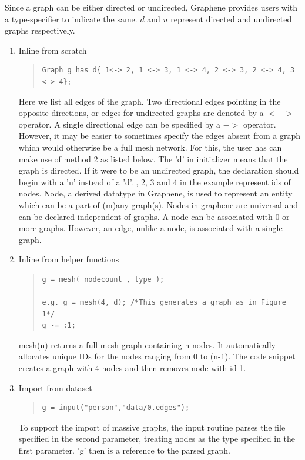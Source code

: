\documentclass[a4paper]{article}
\begin{document}
\noindent Since a graph can be either directed or undirected, Graphene provides users with a type-specifier to indicate the same. $d$ and $u$ represent directed and undirected graphs respectively.
\begin{enumerate}
\item Inline from scratch
\begin{quote}
\begin{verbatim}
Graph g has d{ 1<-> 2, 1 <-> 3, 1 <-> 4, 2 <-> 3, 2 <-> 4, 3 <-> 4};
\end{verbatim}
\end{quote}
\noindent Here we list all edges of the graph. Two directional edges pointing in the opposite directions, or edges for undirected graphs are denoted by a $<->$ operator. A single directional edge can be specified by a $->$ operator. However, it may be easier to sometimes specify the edges absent from a graph which would otherwise be a full mesh network. For this, the user has can make use of method 2 as listed below.
\newline
\newline
The 'd' in initializer means that the graph is directed. If it were to be an undirected graph, the declaration should begin with a 'u' instead of a 'd'.
\newline
{}, 2, 3 and 4 in the example represent ids of nodes. Node, a derived datatype in Graphene, is used to represent an entity which can be a part of (m)any graph(s). Nodes in graphene are universal and can be declared independent of graphs. A node can be associated with 0 or more graphs. However, an edge, unlike a node, is associated with a single graph. 
\newline
\item Inline from helper functions
\begin{quote}
\begin{verbatim}
g = mesh( nodecount , type );

e.g. g = mesh(4, d); /*This generates a graph as in Figure 1*/
g -= :1;
\end{verbatim}
\end{quote}
\noindent mesh(n) returns a full mesh graph containing n nodes. It automatically allocates unique IDs for the nodes ranging from 0 to (n-1). The code snippet creates a graph with 4 nodes and then removes node with id 1.

\item Import from dataset
\begin{quote}
\begin{verbatim}
g = input("person","data/0.edges");
\end{verbatim}
\end{quote}
\noindent To support the import of massive graphs, the input routine parses the file specified in the second parameter, treating nodes as the type specified in the first parameter. 'g' then is a reference to the parsed graph.


\end{enumerate}
\end{document}
